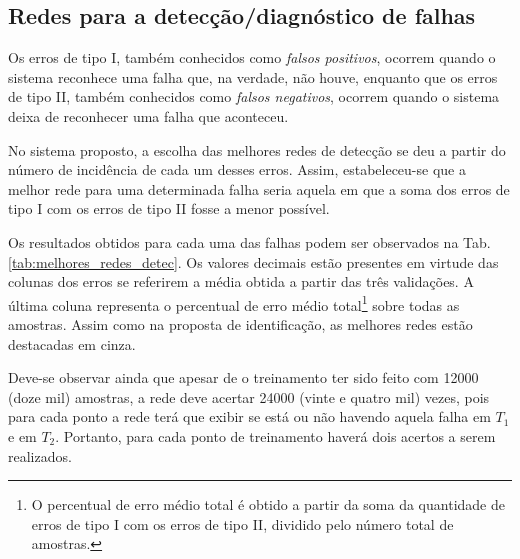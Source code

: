 \subsection{Redes para a detecção/diagnóstico de falhas}
Os erros de tipo I, também conhecidos como {\it falsos positivos}, ocorrem
quando o sistema reconhece uma falha que, na verdade, não houve, enquanto que os
erros de tipo II, também conhecidos como {\it falsos negativos}, ocorrem quando
o sistema deixa de reconhecer uma falha que aconteceu.

No sistema proposto, a escolha das melhores redes de detecção se deu a partir do
número de incidência de cada um desses erros. Assim, estabeleceu-se que a melhor
rede para uma determinada falha seria aquela em que a soma dos erros de tipo I
com os erros de tipo II fosse a menor possível.

Os resultados obtidos para cada uma das falhas podem ser observados na Tab.
\ref{tab:melhores_redes_detec}. Os valores decimais estão presentes em virtude
das colunas dos erros se referirem a média obtida a partir das três validações.
A última coluna representa o percentual de erro médio total\footnote{O
percentual de erro médio total é obtido a partir da soma da quantidade de erros
de tipo I com os erros de tipo II, dividido pelo número total de amostras.}
sobre todas as amostras.  Assim como na proposta de identificação, as melhores
redes estão destacadas em cinza.

Deve-se observar ainda que apesar de o treinamento ter sido feito com 12000
(doze mil) amostras, a rede deve acertar 24000 (vinte e quatro mil) vezes, pois
para cada ponto a rede terá que exibir se está ou não havendo aquela falha em
$T_1$ e em $T_2$. Portanto, para cada ponto de treinamento haverá dois acertos a
serem realizados. 

